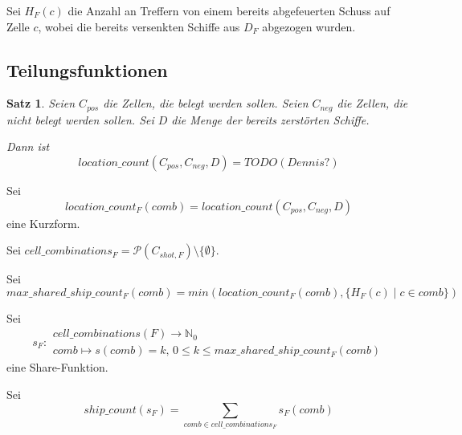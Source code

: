 \documentclass[a4paper,12pt]{llncs}
\newcommand{\N}{{\mathbb{N}}}
\numberwithin{equation}{section}
\newtheorem{satz}{Satz}
\begin{document}
\begin{definition}
Sei $H_F(c)$ die Anzahl an Treffern von einem bereits abgefeuerten Schuss auf Zelle $c$, wobei die bereits versenkten Schiffe aus $D_F$ abgezogen wurden.
\end{definition}

\subsection{Teilungsfunktionen}

\begin{satz}
Seien $C_{pos}$ die Zellen, die belegt werden sollen. Seien $C_{neg}$ die Zellen, die nicht belegt werden sollen.
Sei $D$ die Menge der bereits zerstörten Schiffe.

Dann ist
\[
location\_count(C_{pos}, C_{neg}, D)=TODO (Dennis?)
\]
\end{satz}

\begin{definition}
Sei
\[
location\_count_F(comb)=location\_count(C_{pos}, C_{neg}, D)
\]
eine Kurzform.
\end{definition}

\begin{definition}
Sei $cell\_combinations_F=\mathcal{P}(C_{shot,F}) \setminus \{\emptyset\}$.
\end{definition}

\begin{definition}
Sei
\[
max\_shared\_ship\_count_F(comb)=min(location\_count_F(comb), \{H_F(c) \mid c \in comb\})
\]
\end{definition}

\begin{definition}
Sei
\[
s_F \colon \begin{array}{l} 
          cell\_combinations(F) \rightarrow \N_0 \\ 
          comb\mapsto s(comb)=k, \, 0 \leq k \leq max\_shared\_ship\_count_F(comb)
         \end{array}
\]
eine Share-Funktion.
\end{definition}

\begin{definition}
Sei
\[
ship\_count(s_F)=\sum_{comb \in cell\_combinations_F}{s_F(comb)}
\]
\end{definition}
\end{document}

